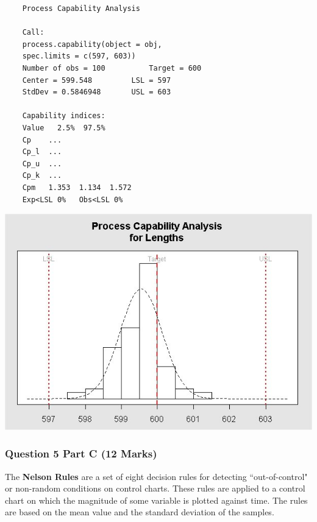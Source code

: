 \documentclass[a4paper,12pt]{article}
\begin{document}
\newpage
\begin{framed}
	\begin{verbatim}
	Process Capability Analysis
	
	Call:
	process.capability(object = obj,  
	spec.limits = c(597, 603))
	Number of obs = 100          Target = 600
	Center = 599.548         LSL = 597
	StdDev = 0.5846948       USL = 603
	
	Capability indices:
	Value   2.5%  97.5%
	Cp    ...
	Cp_l  ...
	Cp_u  ...
	Cp_k  ...
	Cpm   1.353  1.134  1.572
	Exp<LSL 0%   Obs<LSL 0%
	\end{verbatim}
\end{framed}



\begin{center}
	\includegraphics[scale=0.55]{images/ExamQ4hist}
\end{center}
\newpage
%
%
%


\subsubsection*{Question 5 Part C (12 Marks)}
The \textbf{Nelson Rules} are a set of eight decision rules for detecting ``out-of-control" or non-random conditions on control charts. These rules are applied to a control chart on which the magnitude of some variable is plotted against time. The rules are based on the mean value and the standard deviation of the samples.\\
\end{document}
